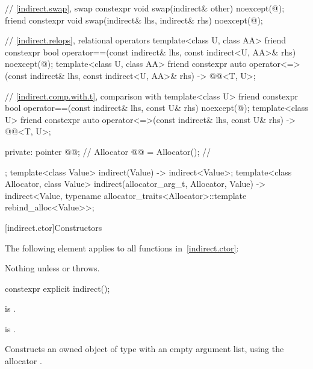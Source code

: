 \begin{codeblock}
{{    // \ref{indirect.swap}, swap
    constexpr void swap(indirect& other) noexcept(@\seebelow@);
    friend constexpr void swap(indirect& lhs, indirect& rhs) noexcept(@\seebelow@);

    // \ref{indirect.relops}, relational operators
    template<class U, class AA>
      friend constexpr bool operator==(const indirect& lhs, const indirect<U, AA>& rhs)
        noexcept(@\seebelow@);
    template<class U, class AA>
      friend constexpr auto operator<=>(const indirect& lhs, const indirect<U, AA>& rhs)
        -> @@<T, U>;

    // \ref{indirect.comp.with.t}, comparison with 
    template<class U>
      friend constexpr bool operator==(const indirect& lhs, const U& rhs) noexcept(@\seebelow@);
    template<class U>
      friend constexpr auto operator<=>(const indirect& lhs, const U& rhs)
        -> @@<T, U>;

  private:
    pointer @@;                          // \expos
    Allocator @@ = Allocator();      // \expos
  };
  template<class Value>
    indirect(Value) -> indirect<Value>;
  template<class Allocator, class Value>
    indirect(allocator_arg_t, Allocator, Value)
      -> indirect<Value, typename allocator_traits<Allocator>::template rebind_alloc<Value>>;
}
\end{codeblock}

[indirect.ctor]{Constructors}

\pnum
The following element applies to all functions in~\ref{indirect.ctor}:

\begin{itemdescr}
\pnum
\throws
Nothing unless  or
 throws.
\end{itemdescr}

%
\begin{itemdecl}
constexpr explicit indirect();
\end{itemdecl}

\begin{itemdescr}
\pnum
\constraints
{} is .

\pnum
\mandates
{} is .

\pnum
\effects
Constructs an owned object of type  with an empty argument list,
using the allocator .
\end{itemdescr}

